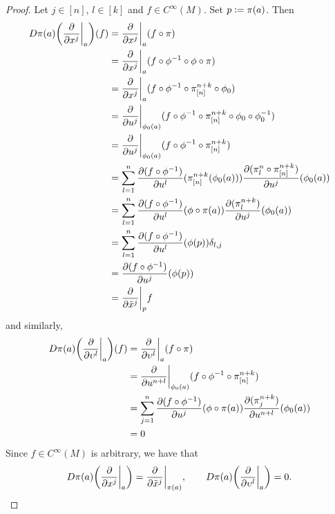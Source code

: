 \documentclass{book}
\begin{document}
\begin{proof}
	Let $j \in [n]$, $l \in [k]$ and $f \in C^{\infty}(M)$. Set $p \vcentcolon= \pi(a)$. Then
	\begin{align*}
		D \pi(a) \bigg( \frac{\partial}{\partial x^j} \bigg|_a \bigg) (f)
		& = \frac{\partial}{\partial x^j} \bigg|_a (f \circ \pi) \\
		& = \frac{\partial}{\partial x^j} \bigg|_a (f \circ \phi^{-1} \circ \phi \circ \pi) \\
		& = \frac{\partial}{\partial x^j} \bigg|_a (f \circ \phi^{-1} \circ \pi^{n+k}_{[n]} \circ  \phi_0) \\
		& = \frac{\partial}{\partial u^j} \bigg|_{\phi_0(a)} (f \circ \phi^{-1} \circ \pi^{n+k}_{[n]} \circ  \phi_0 \circ \phi_0^{-1}) \\
		& = \frac{\partial}{\partial u^j} \bigg|_{\phi_0(a)} (f \circ \phi^{-1} \circ \pi^{n+k}_{[n]}) \\
		& = \sum_{l=1}^n \frac{\partial (f \circ \phi^{-1})}{\partial u^l}(\pi^{n+k}_{[n]}(\phi_0(a)))  \frac{\partial(\pi^n_l \circ \pi^{n+k}_{[n]})}{\partial u^j}(\phi_0(a))  \\
		& = \sum_{l=1}^n \frac{\partial (f \circ \phi^{-1})}{\partial u^l}(\phi \circ \pi(a))  \frac{\partial(\pi^{n+k}_l)}{\partial u^j}(\phi_0(a)) \\
		& = \sum_{l=1}^n \frac{\partial (f \circ \phi^{-1})}{\partial u^l}(\phi(p))   \delta_{l,j} \\
		& = \frac{\partial (f \circ \phi^{-1})}{\partial u^j}(\phi(p))  \\
		& = \frac{\partial}{\partial \tilde{x}^j} \bigg|_p f  \\
	\end{align*}
	and similarly,
	\begin{align*}
		D \pi(a) \bigg( \frac{\partial}{\partial \upsilon^l} \bigg|_a \bigg) (f)
		& = \frac{\partial}{\partial \upsilon^l} \bigg|_a (f \circ \pi) \\
		& = \frac{\partial}{\partial u^{n+l}} \bigg|_{\phi_0(a)} (f \circ \phi^{-1} \circ \pi^{n+k}_{[n]}) \\
		& = \sum_{j=1}^n \frac{\partial (f \circ \phi^{-1})}{\partial u^j}(\phi \circ \pi(a))  \frac{\partial(\pi^{n+k}_j)}{\partial u^{n+l}}(\phi_0(a)) \\
		& = 0
	\end{align*}
	Since $f \in C^{\infty}(M)$ is arbitrary, we have that $$D \pi(a) \bigg( \frac{\partial}{\partial x^j} \bigg|_a \bigg) = \frac{\partial}{\partial \tilde{x}^j} \bigg|_{\pi(a)}, \quad \quad D \pi(a) \bigg( \frac{\partial}{\partial \upsilon^l} \bigg|_a \bigg) = 0.$$
\end{proof}
\end{document}
